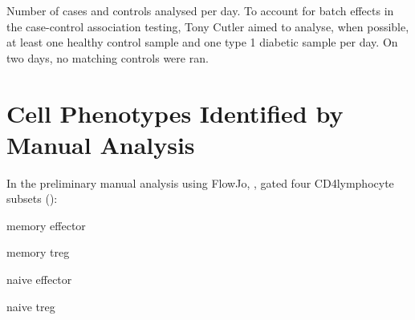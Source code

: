 { Number of cases and controls analysed per day. }
{
  To account for batch effects in the case-control association testing,
  Tony Cutler aimed to analyse, when possible,
  at least one healthy control sample and one type 1 diabetic sample per day.
  On two days, no matching controls were ran.
}




\section{Cell Phenotypes Identified by Manual Analysis}

In the preliminary manual analysis using FlowJo, ,
gated four CD4\positive lymphocyte subsets ():
\begin{itemise}
  \item memory effector
  \item memory treg
  \item naive effector
  \item naive treg
\end{itemise}
% 
